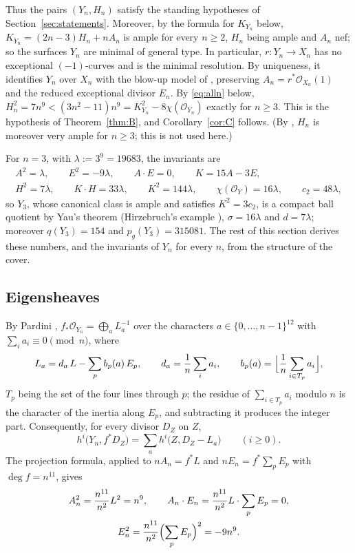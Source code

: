 \documentclass[11pt]{amsart}
\theoremstyle{remark}
\theoremstyle{definition}
\newcommand{\cO}{\mathcal{O}}
\begin{document}
Thus the pairs $(Y_n,H_n)$ satisfy the standing hypotheses of Section~\ref{sec:statements}. Moreover, by the formula for $K_{Y_n}$ below, $K_{Y_n}=(2n-3)H_n+nA_n$ is ample for every $n\ge2$, $H_n$ being ample and $A_n$ nef; so the surfaces $Y_n$ are minimal of general type. In particular, $r\colon Y_n\to X_n$ has no exceptional $(-1)$-curves and is the minimal resolution. By uniqueness, it identifies $Y_n$ over $X_n$ with the blow-up model of \cite[\S3.2]{An}, preserving $A_n=r^*\cO_{X_n}(1)$ and the reduced exceptional divisor $E_n$. By \eqref{eq:alln} below, $H_n^2=7n^9<(3n^2-11)n^9=K_{Y_n}^2-8\chi(\cO_{Y_n})$ exactly for $n\ge3$. This is the hypothesis of Theorem~\ref{thm:B}, and Corollary~\ref{cor:C} follows. (By \cite[Thm.~1.2]{An}, $H_n$ is moreover very ample for $n\ge3$; this is not used here.)

For $n=3$, with $\lambda:=3^9=19683$, the invariants are
\begin{gather*}
A^2=\lambda,\qquad E^2=-9\lambda,\qquad A\cdot E=0,\qquad K=15A-3E,\\
H^2=7\lambda,\qquad K\cdot H=33\lambda,\qquad K^2=144\lambda,\qquad \chi(\cO_Y)=16\lambda,\qquad c_2=48\lambda,
\end{gather*}
so $Y_3$, whose canonical class is ample and satisfies $K^2=3c_2$, is a compact ball quotient by Yau's theorem (Hirzebruch's example \cite{Hi}), $\sigma=16\lambda$ and $d=7\lambda$; moreover $q(Y_3)=154$ and $p_g(Y_3)=315081$. The rest of this section derives these numbers, and the invariants of $Y_n$ for every $n$, from the structure of the cover.

\subsection*{Eigensheaves}
By Pardini \cite{Pa}, $f_*\cO_{Y_n}=\bigoplus_aL_a^{-1}$ over the characters $a\in\{0,\dots,n-1\}^{12}$ with $\sum_ia_i\equiv0\pmod n$, where
\[
L_a=d_a\,L-\sum_pb_p(a)\,E_p,\qquad d_a=\frac1n\sum_ia_i,\qquad b_p(a)=\Bigl\lfloor\frac1n\sum_{i\in T_p}a_i\Bigr\rfloor,
\]
$T_p$ being the set of the four lines through $p$; the residue of $\sum_{i\in T_p}a_i$ modulo $n$ is the character of the inertia along $E_p$, and subtracting it produces the integer part. Consequently, for every divisor $D_Z$ on $Z$,
\begin{equation}\label{eq:eigen}
h^i\bigl(Y_n,f^*D_Z\bigr)=\sum_ah^i\bigl(Z,D_Z-L_a\bigr)\qquad(i\ge0).
\end{equation}
The projection formula, applied to $nA_n=f^*L$ and $nE_n=f^*\sum_pE_p$ with $\deg f=n^{11}$, gives
\begin{equation}\label{eq:hesse-intersections}
\begin{gathered}
A_n^2=\frac{n^{11}}{n^2}L^2=n^9,\qquad
A_n\cdot E_n=\frac{n^{11}}{n^2}L\cdot\sum_pE_p=0,\\
E_n^2=\frac{n^{11}}{n^2}\Bigl(\sum_pE_p\Bigr)^2=-9n^9.
\end{gathered}
\end{equation}
\end{document}

